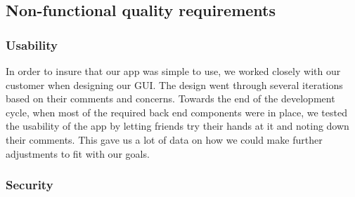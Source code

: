 \subsection{Non-functional quality requirements}

\subsubsection{Usability}
In order to insure that our app was simple to use, we worked closely with our customer when designing our GUI. The design went through several iterations based on their comments and concerns. Towards the end of the development cycle, when most of the required back end components were in place, we tested the usability of the app by letting friends try their hands at it and noting down their comments. This gave us a lot of data on how we could make further adjustments to fit with our goals.

\newpage

\subsubsection{Security}

